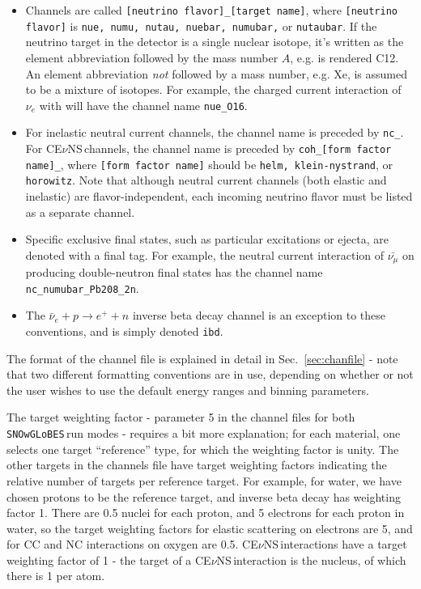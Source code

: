 \documentclass{article}
\newcommand{\cev}{CE$\nu$NS\,}
\newcommand{\snow}{\texttt{SNOwGLoBES}\,}
\begin{document}
\begin{itemize}
    \item  Channels are called \texttt{[neutrino flavor]\_[target name]}, where \texttt{[neutrino flavor]} is \texttt{nue, numu, nutau, nuebar, numubar,} or \texttt{nutaubar}.  If the neutrino target in the detector is a single nuclear isotope, it's written as the element abbreviation followed by the mass number $A$, e.g.  is rendered C12. An element abbreviation \textit{not} followed by a mass number, e.g. Xe, is assumed to be a mixture of isotopes. For example, the charged current interaction of $\nu_e$ with  will have the channel name \texttt{nue\_O16}.
    
    \item For inelastic neutral current channels, the channel name is preceded by \texttt{nc\_}. For \cev channels, the channel name is preceded by \texttt{coh\_[form factor name]\_}, where \texttt{[form factor name]} should be \texttt{helm, klein-nystrand}, or \texttt{horowitz}. Note that although neutral current channels (both elastic and inelastic) are flavor-independent, each incoming neutrino flavor must be listed as a separate channel.
    
    \item Specific exclusive final states, such as particular excitations or ejecta, are denoted with a final tag. For example, the neutral current interaction of $\bar{\nu_\mu}$ on  producing double-neutron final states has the channel name \texttt{nc\_numubar\_Pb208\_2n}.
    
    \item The $\bar{\nu}_e+ p \rightarrow e^+ + n$ inverse beta decay channel is an exception to these conventions, and is simply denoted \texttt{ibd}.
\end{itemize}

The format of the channel file is explained in detail in Sec.~\ref{sec:chanfile} - note that two different formatting conventions are in use, depending on whether or not the user wishes to use the default energy ranges and binning parameters.

The target weighting factor - parameter 5 in the channel files for both \snow run modes - requires a bit more explanation; for each material, one selects one target ``reference'' type, for which the weighting factor is unity.  The other targets in the channels file have target weighting factors indicating the relative number of targets per reference target.  For example, for water, we have chosen protons to be the reference target, and inverse beta decay has weighting factor 1. There are 0.5  nuclei for each proton, and 5 electrons for each proton in water, so the target weighting factors for elastic scattering on electrons are 5, and for CC and NC interactions on oxygen are 0.5. \cev interactions have a target weighting factor of 1 - the target of a \cev interaction is the nucleus, of which there is 1 per atom.
\end{document}

